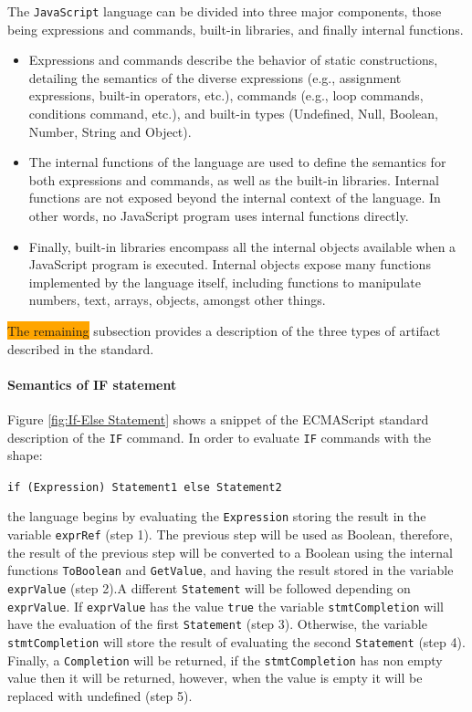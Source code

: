 \documentclass[runningheads]{llncs}
\begin{document}
The \texttt{JavaScript} language can be divided into three major components, those being expressions and commands, built-in libraries, and finally internal functions.
%
\begin{itemize}
\item Expressions and commands describe the behavior of static constructions, detailing the semantics of the diverse expressions (e.g., assignment expressions, built-in operators, etc.), commands (e.g., loop commands, conditions command, etc.), and built-in types (Undefined, Null, Boolean, Number, String and Object).
%
\item The internal functions of the language are used to define the semantics for both expressions and commands, as well as the built-in libraries. Internal functions are not exposed beyond the internal context of the language. In other words, no JavaScript program uses internal functions directly.
%
\item Finally, built-in libraries encompass all the internal objects available when a JavaScript program is executed. Internal objects expose many functions implemented by the language itself, including functions to manipulate numbers, text, arrays, objects, amongst other things.
\end{itemize}


\colorbox{orange}{The remaining} subsection provides a description of the three types of artifact described in the standard.

\paragraph{Semantics of IF statement}
Figure \ref{fig:If-Else Statement} shows a snippet of the ECMAScript standard description of the \texttt{IF} command. In order to evaluate \texttt{IF} commands with the shape:

\begin{center}
\texttt{if (Expression) Statement1 else Statement2}
\end{center}

\noindent the language begins by evaluating the \texttt{Expression} storing the result in the variable \texttt{exprRef} (step 1). The previous step will be used as Boolean, therefore, the result of the previous step will be converted to a Boolean using the internal functions \texttt{ToBoolean} and \texttt{GetValue}, and having the result stored in the variable \texttt{exprValue} (step 2).A different \texttt{Statement} will be followed depending on \texttt{exprValue}. If \texttt{exprValue} has the value \texttt{true} the variable \texttt{stmtCompletion} will have the evaluation of the first \texttt{Statement} (step 3). Otherwise, the variable \texttt{stmtCompletion} will store the result of evaluating the second \texttt{Statement} (step 4). Finally, a \texttt{Completion} will be returned, if the \texttt{stmtCompletion} has non empty value then it will be returned, however, when the value is empty it will be replaced with undefined (step 5).
\end{document}
